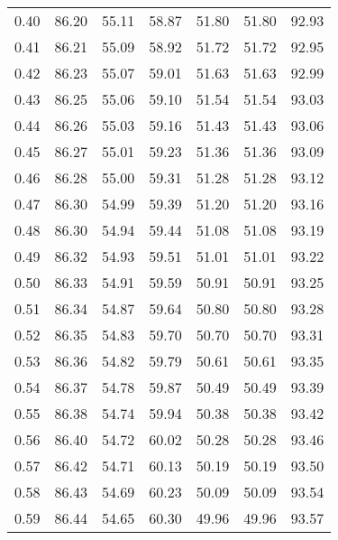 \begin{tabular}{|c|c|c|c|c|c|c|}
      0.40 &     86.20 &     55.11 &      58.87 &   51.80 &      51.80 &         92.93 \\
      0.41 &     86.21 &     55.09 &      58.92 &   51.72 &      51.72 &         92.95 \\
      0.42 &     86.23 &     55.07 &      59.01 &   51.63 &      51.63 &         92.99 \\
      0.43 &     86.25 &     55.06 &      59.10 &   51.54 &      51.54 &         93.03 \\
      0.44 &     86.26 &     55.03 &      59.16 &   51.43 &      51.43 &         93.06 \\
      0.45 &     86.27 &     55.01 &      59.23 &   51.36 &      51.36 &         93.09 \\
      0.46 &     86.28 &     55.00 &      59.31 &   51.28 &      51.28 &         93.12 \\
      0.47 &     86.30 &     54.99 &      59.39 &   51.20 &      51.20 &         93.16 \\
      0.48 &     86.30 &     54.94 &      59.44 &   51.08 &      51.08 &         93.19 \\
      0.49 &     86.32 &     54.93 &      59.51 &   51.01 &      51.01 &         93.22 \\
      0.50 &     86.33 &     54.91 &      59.59 &   50.91 &      50.91 &         93.25 \\
      0.51 &     86.34 &     54.87 &      59.64 &   50.80 &      50.80 &         93.28 \\
      0.52 &     86.35 &     54.83 &      59.70 &   50.70 &      50.70 &         93.31 \\
      0.53 &     86.36 &     54.82 &      59.79 &   50.61 &      50.61 &         93.35 \\
      0.54 &     86.37 &     54.78 &      59.87 &   50.49 &      50.49 &         93.39 \\
      0.55 &     86.38 &     54.74 &      59.94 &   50.38 &      50.38 &         93.42 \\
      0.56 &     86.40 &     54.72 &      60.02 &   50.28 &      50.28 &         93.46 \\
      0.57 &     86.42 &     54.71 &      60.13 &   50.19 &      50.19 &         93.50 \\
      0.58 &     86.43 &     54.69 &      60.23 &   50.09 &      50.09 &         93.54 \\
      0.59 &     86.44 &     54.65 &      60.30 &   49.96 &      49.96 &         93.57 \\

\end{tabular}
